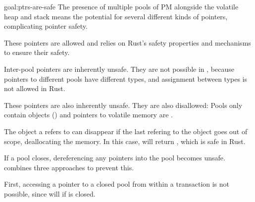 \begin{goaltrue}{goal:ptrs-are-safe}
The presence of multiple pools of PM alongside the volatile heap and stack
means the potential for several different kinds of pointers, complicating 
pointer safety.

 These pointers are allowed and \this{}
relies on Rust's safety properties and mechanisms to ensure their safety.

 Inter-pool pointers are inherently
unsafe.  They are not possible in \this{}, because pointers to different
pools have different types, and assignment between types is not allowed in Rust.


 These pointers are
also inherently unsafe.  They are also disallowed: Pools only contain
 objects () and pointers to
volatile memory are .

 The object a
 refers to can disappear if the last  refering to the
object goes out of scope, deallocating the memory. In this case,
 will return , which is safe in Rust.

 If a pool closes, dereferencing any
pointers into the pool becomes unsafe.  \This{} combines three approaches to
prevent this.

First, accessing a pointer to a closed pool from within a transaction is not
possible, since  will  if  is
closed.


\end{goaltrue}
